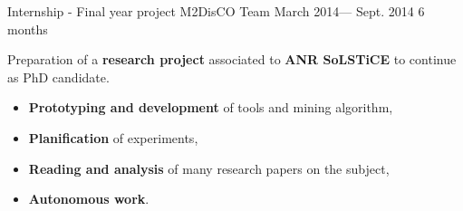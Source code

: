\jobposition%
{Internship - Final year project}%
{M2DisCO Team}
{March 2014--- Sept. 2014}%
{6 months}%
{
	Preparation of a \textbf{research project} associated to \textbf{ANR SoLSTiCE}
	to continue as PhD candidate.
	\vspace{0.5em}
	\begin{itemize}
		\item \textbf{Prototyping and development} of tools and mining algorithm,
		\item \textbf{Planification} of experiments,
		\item \textbf{Reading and analysis} of many research papers on the subject,
		\item \textbf{Autonomous work}.
	\end{itemize}
	\vspace{0.5em}
}
